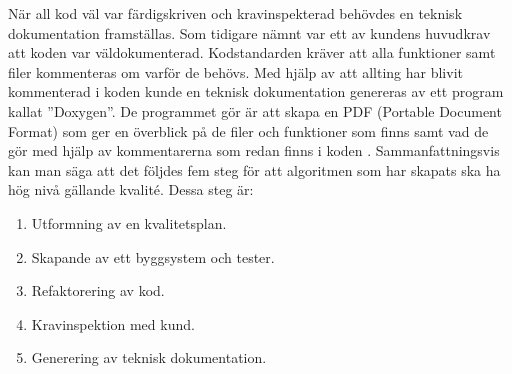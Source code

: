 \newline
\newline
När all kod väl var färdigskriven och kravinspekterad behövdes en teknisk dokumentation framställas. Som tidigare nämnt var ett av kundens huvudkrav att koden var väldokumenterad. Kodstandarden kräver att alla funktioner samt filer kommenteras om varför de behövs. Med hjälp av att allting har blivit kommenterad i koden kunde en teknisk dokumentation genereras av ett program kallat ''Doxygen''. De programmet gör är att skapa en PDF (Portable Document Format) som ger en överblick på de filer och funktioner som finns samt vad de gör med hjälp av kommentarerna som redan finns i koden \citep{Doxygen}.
\newline
\newline
Sammanfattningsvis kan man säga att det följdes fem steg för att algoritmen som har skapats ska ha hög nivå gällande kvalité. Dessa steg är:

\begin{enumerate}
\item{Utformning av en kvalitetsplan.}
\item{Skapande av ett byggsystem och tester.}
\item{Refaktorering av kod.}
\item{Kravinspektion med kund.}
\item{Generering av teknisk dokumentation.}
\end{enumerate}
 
